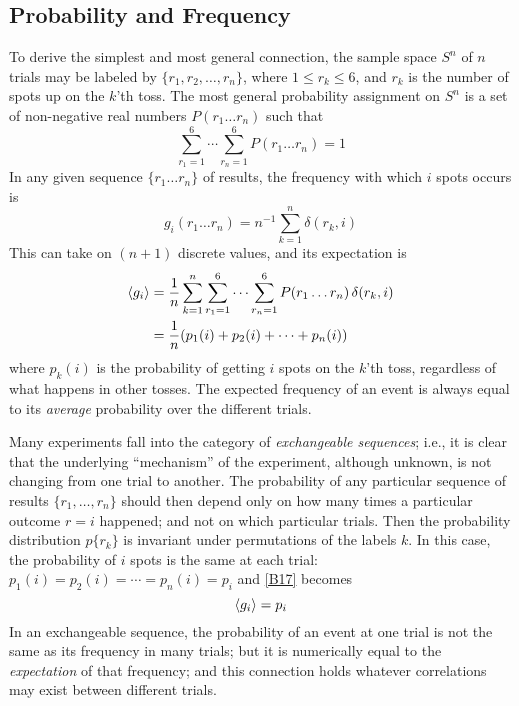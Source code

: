 \subsection{Probability and Frequency}
To derive the simplest and most general connection, the sample space $S^n$ of $n$ trials may be labeled by $\{r_1,r_2,\ldots,r_n\}$, where $1\leq r_k \leq 6$, and $r_k$ is the number of spots up on the $k$'th toss.
The most general probability assignment on $S^n$ is a set of non-negative real numbers $P(r_1\ldots r_n)$ such that
\begin{equation}
	\label{B15}
	\sum_{r_1=1}^{6} \cdots \sum_{r_n=1}^{6} P(r_1\ldots r_n) = 1
\end{equation}
In any given sequence $\{r_1\ldots r_n\}$ of results, the frequency with which $i$ spots occurs is
\begin{equation}
	\label{B16}
	g_i(r_1\ldots r_n) = n^{-1} \sum_{k=1}^{n} \delta(r_k, i)
\end{equation}
This can take on $(n+1)$ discrete values, and its expectation is
\begin{equation}
\label{B17}
\begin{split}
	\langle g_i\rangle
	&= \frac{1}{n} \sum_{k=1}^{n}  \sum_{r_1=1}^{6} \cdots \sum_{r_n=1}^{6} P(r_1\ldots r_n) \mathop{}\!\delta(r_k, i)\\
	&= \frac{1}{n} (p_1(i) + p_2(i) + \cdots + p_n(i))
\end{split}
\end{equation}
where $p_k(i)$ is the probability of getting $i$ spots on the $k$'th toss, regardless of what happens in other tosses.
The expected frequency of an event is always equal to its \emph{average} probability over the different trials.

Many experiments fall into the category of \emph{exchangeable sequences}; i.e., it is clear that the underlying ``mechanism'' of the experiment, although unknown, is not changing from one trial to another.
The probability of any particular sequence of results $\{r_1,\ldots,r_n\}$ should then depend only on how many times a particular outcome $r=i$ happened; and not on which particular trials.
Then the probability distribution $p\{r_k\}$ is invariant under permutations of the labels $k$.
In this case, the probability of $i$ spots is the same at each trial: $p_1(i) = p_2(i) = \cdots = p_n(i) = p_i$ and \eqref{B17} becomes
\begin{equation}
	\label{B18}
	\langle g_i\rangle = p_i
\end{equation}
In an exchangeable sequence, the probability of an event at one trial is not the same as its frequency in many trials; but it is numerically equal to the \emph{expectation} of that frequency; and this connection holds whatever correlations may exist between different trials.

